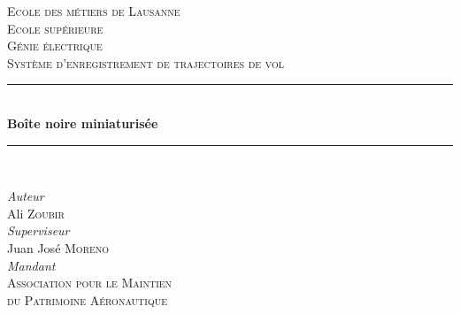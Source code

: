 \begin{titlepage} %
	\newcommand{\HRule}{\rule{\linewidth}{0.5mm}} %
	
	\center %
	
	
	\textsc{\LARGE Ecole des métiers de Lausanne \\ Ecole supérieure}\\[1.5cm] %
	
	\textsc{\Large Génie électrique}\\[0.5cm] %
	
	\textsc{\large Système d'enregistrement de trajectoires de vol}\\[0.5cm] %
	
	\vspace{+25mm}
	
	\HRule\\[0.4cm]
	
	{\huge\bfseries Boîte noire miniaturisée}\\[0.4cm] %
	
	\HRule\\[1.5cm]
	
	\vspace{+10mm}
	

	\begin{center}
		\large
		\textit{Auteur}\\
		Ali \textsc{Zoubir} \vspace{+5mm}\\ 
		\large
		\textit{Superviseur} \\
		Juan José \textsc{Moreno} \vspace{+5mm}\\
		\large
		\textit{Mandant}\\
		\textsc{Association pour le Maintien \\ du Patrimoine Aéronautique}
	\end{center}


\end{titlepage}
